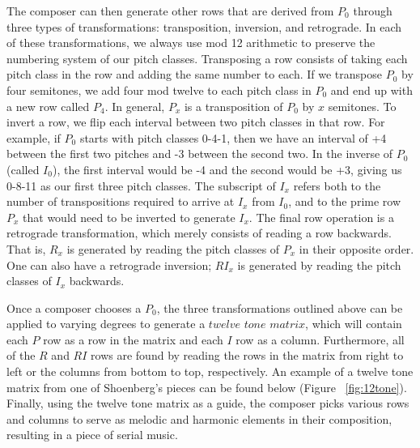 The composer can then generate other rows that are derived from $P_0$ through three 
types of transformations: transposition, inversion, and retrograde. In each of these 
transformations, we always use mod 12 arithmetic to preserve the numbering system of 
our pitch classes. Transposing a row consists of taking each pitch class in the row and 
adding the same number to each. If we transpose $P_0$ by four semitones, we add four mod 
twelve to each pitch class in $P_0$ and end up with a new row called $P_4$. In general, $P_x$ 
is a transposition of $P_0$ by $x$ semitones. To invert a row, we flip each interval between two 
pitch classes in that row. For example, if $P_0$ starts with pitch classes 0-4-1, then 
we have an interval of +4 between the first two pitches and -3 between the second two. 
In the inverse of $P_0$ (called $I_0$), the first interval would be -4 and the second would
be +3, giving us 0-8-11 as our first three pitch classes. The subscript of $I_x$  refers 
both to the number of transpositions required to arrive at $I_x$ from $I_0$, and to the 
prime row $P_x$ that would need to be inverted to generate $I_x$. The final row operation 
is a retrograde transformation, which merely consists of reading a row backwards. That is, $R_x$
is generated by reading the pitch classes of $P_x$ in their opposite order. One can also 
have a retrograde inversion; $RI_x$ is generated by reading the pitch classes of $I_x$ backwards.

Once a composer chooses a $P_0$, the three transformations outlined above can be applied 
to varying degrees to generate a $twelve$ $tone$ $matrix$, which will contain each $P$ row 
as a row in the matrix and each $I$ row as a column. Furthermore, all of the $R$ and $RI$
rows are found by reading the rows in the matrix from right to left or the columns 
from bottom to top, respectively. An example of a twelve tone matrix from one of Shoenberg's 
pieces can be found below (Figure ~\ref{fig:12tone}). Finally, using the twelve tone 
matrix as a guide, the composer picks various rows and columns to serve as melodic and 
harmonic elements in their composition, resulting in a piece of serial music.

